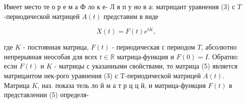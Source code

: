 \documentclass[10pt]{article}
\begin{document}
Имеет место те о р е м а Ф ло к е- Л я п у но в а: матрицант уравнения (3) с $T$-периодической матрицей $A(t)$ представим в виде



\[

X(t)=F(t) e^{t K},

\]



где $K$ - постоянная матрица, $F(t)$ - периодическая с периодом $T$, абсолютно непрерывная неособая для всех $t \in \mathbb{R}$ матрица-функция и $F(0)=I$. Обратно: если $F(t)$ и $K$ - матрицы с указанными свойствами, то матрица (5) является матрицантом нек-рого уравнения (3) с T-периодической матрицей $A(t)$. Матрица $K$, наз. показа тель ло й м а т р ц ц й, и матрица-функция $F(t)$ в представлении (5) определя-
\end{document}
